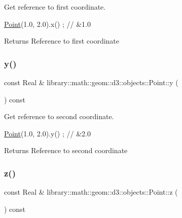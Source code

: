 Get reference to first coordinate. 


\begin{DoxyCode}
\hyperlink{classlibrary_1_1math_1_1geom_1_1d3_1_1objects_1_1_point_a617e690ab6091af3de729cee337e309e}{Point}(1.0, 2.0).x() ; \textcolor{comment}{// &1.0}
\end{DoxyCode}


\begin{DoxyReturn}{Returns}
Reference to first coordinate 
\end{DoxyReturn}
\mbox{\label{classlibrary_1_1math_1_1geom_1_1d3_1_1objects_1_1_point_a6e2590786e8261728b5b230823c2784d}} 
\subsubsection{\texorpdfstring{y()}{y()}}
{\footnotesize\ttfamily const Real \& library\+::math\+::geom\+::d3\+::objects\+::\+Point\+::y (\begin{DoxyParamCaption}{ }\end{DoxyParamCaption}) const}



Get reference to second coordinate. 


\begin{DoxyCode}
\hyperlink{classlibrary_1_1math_1_1geom_1_1d3_1_1objects_1_1_point_a617e690ab6091af3de729cee337e309e}{Point}(1.0, 2.0).y() ; \textcolor{comment}{// &2.0}
\end{DoxyCode}


\begin{DoxyReturn}{Returns}
Reference to second coordinate 
\end{DoxyReturn}
\mbox{\label{classlibrary_1_1math_1_1geom_1_1d3_1_1objects_1_1_point_a4e121b68d1eb71be9adc575e7149c47e}} 
\subsubsection{\texorpdfstring{z()}{z()}}
{\footnotesize\ttfamily const Real \& library\+::math\+::geom\+::d3\+::objects\+::\+Point\+::z (\begin{DoxyParamCaption}{ }\end{DoxyParamCaption}) const}



